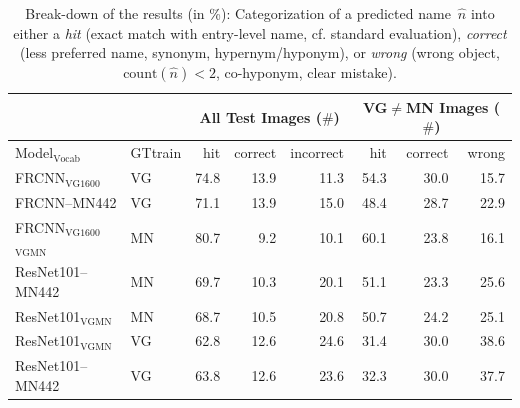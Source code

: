 \begin{table}[t]
	\centering
	\small
	\begin{tabular}{l|l|r@{~}r@{~}r@{~}||r@{~}r@{~}r@{~}}
		\toprule
		& & \multicolumn{3}{c}{All Test Images ($\#$)} 
		& \multicolumn{3}{c}{VG$\neq$MN Images ($\#$)}\\
	\toprule
	Model$_{\text{Vocab}}$	& GTtrain  
	&  hit &  correct &  incorrect &  hit &  correct &  wrong \\
	\midrule
	FRCNN$_{\text{VG1600}}$ & VG           &         74.8 &                  13.9 &                    11.3 &         54.3 &                  30.0 &                    15.7 \\
	FRCNN--MN442 & VG &         71.1 &                  13.9 &                    15.0 &         48.4 &                  28.7 &                    22.9 \\
	\midrule \midrule
	FRCNN$_{\text{VG1600}}$$_{\text{VGMN}}$ & MN %
	 &         80.7 &                   9.2 &                    10.1 &         60.1 &                  23.8 &                    16.1 \\
	\midrule
	ResNet101--MN442 & MN %
	 &         69.7 &                  10.3 &                    20.1 &         51.1 &                  23.3 &                    25.6 \\
	ResNet101$_{\text{VGMN}}$ & MN%
	 &         68.7 &                  10.5 &                    20.8 &         50.7 &                  24.2 &                    25.1 \\
	ResNet101$_{\text{VGMN}}$ & VG %
	 &         62.8 &                  12.6 &                    24.6 &         31.4 &                  30.0 &                    38.6 \\
	ResNet101--MN442 & VG %
	 &         63.8 &                  12.6 &                    23.6 &         32.3 &                  30.0 &                    37.7 \\
	\bottomrule
\end{tabular}
\caption{Break-down of the results (in \%): Categorization of a predicted name\ $\hat{n}$ into either a \textit{hit} (exact match with entry-level name, cf. standard evaluation), \textit{correct} (less preferred name, synonym, hypernym/hyponym), or \textit{wrong} (wrong object, $\text{count}(\hat{n})<2$, co-hyponym, clear mistake). \label{tab:exp_overview_results}}
\end{table}

